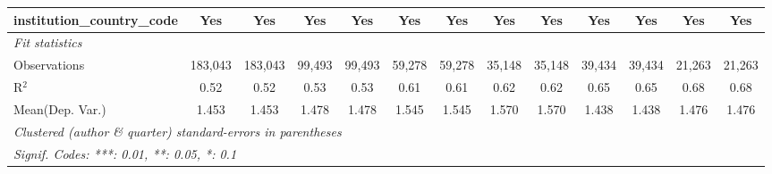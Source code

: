 \begin{tabular}{lcccccccccccc}
   institution\_country\_code               & Yes           & Yes             & Yes           & Yes            & Yes           & Yes           & Yes           & Yes           & Yes           & Yes           & Yes          & Yes\\  
   \midrule
   \emph{Fit statistics}\\
   Observations                             & 183,043       & 183,043         & 99,493        & 99,493         & 59,278        & 59,278        & 35,148        & 35,148        & 39,434        & 39,434        & 21,263       & 21,263\\  
   R$^2$                                    & 0.52          & 0.52            & 0.53          & 0.53           & 0.61          & 0.61          & 0.62          & 0.62          & 0.65          & 0.65          & 0.68         & 0.68\\  
Mean(Dep. Var.) & 1.453 & 1.453 & 1.478 & 1.478 & 1.545 & 1.545 & 1.570 & 1.570 & 1.438 & 1.438 & 1.476 & 1.476 \\
   \midrule \midrule
   \multicolumn{13}{l}{\emph{Clustered (author \& quarter) standard-errors in parentheses}}\\
   \multicolumn{13}{l}{\emph{Signif. Codes: ***: 0.01, **: 0.05, *: 0.1}}\\
\end{tabular}
\par\endgroup
